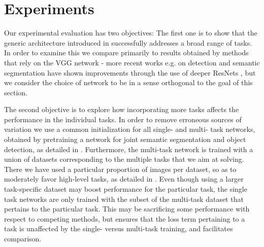 \documentclass[10pt,twocolumn,letterpaper]{article}
\begin{document}
\section{Experiments}

 

Our experimental evaluation has two objectives:
The first one is to show that the generic \ubernet architecture  introduced in  successfully addresses a broad range of tasks.
In order to examine this we compare primarily to results obtained by methods that rely on the VGG network \cite{simonyan2014very} - more recent works e.g. on detection \cite{DaiLHS16} and semantic segmentation \cite{ChenPK0Y16} have shown improvements through the use of deeper ResNets \cite{HeZRS15}, but we consider the choice of network to be in a sense orthogonal to the goal of this section. 

The second objective is to explore how incorporating more tasks affects the  performance in the individual tasks. In order to remove erroneous sources of variation we use a common initialization for all single- and multi- task networks, obtained by pretraining a network for joint semantic segmentation and object detection, as detailed in . Furthermore, the multi-task network is trained with a union of datasets corresponding to the multiple tasks that we aim at solving. There we have used a particular proportion  of images per dataset, so as to moderately favor high-level tasks, as detailed in . Even though using a larger task-specific dataset may boost performance for the particular task, the single task networks are only trained with the subset of the multi-task dataset that pertains to the particular task. 
This may be sacrificing some performance with respect to competing methods, but ensures that the loss term pertaining to a task is unaffected by the single- versus multi-task training, and facilitates comparison. 


 
\end{document}
